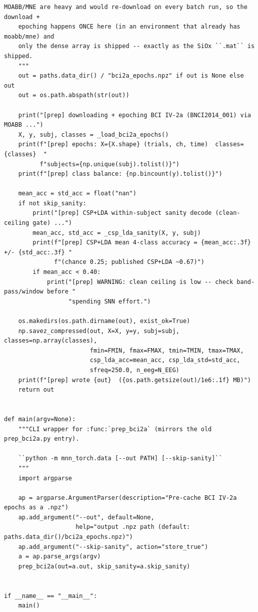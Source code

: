 \begin{lstlisting}[caption={mnn\_torch/data.py},label={lst:mnn-src-data}]
    MOABB/MNE are heavy and would re-download on every batch run, so the download +
    epoching happens ONCE here (in an environment that already has moabb/mne) and
    only the dense array is shipped -- exactly as the SiOx ``.mat`` is shipped.
    """
    out = paths.data_dir() / "bci2a_epochs.npz" if out is None else out
    out = os.path.abspath(str(out))

    print("[prep] downloading + epoching BCI IV-2a (BNCI2014_001) via MOABB ...")
    X, y, subj, classes = _load_bci2a_epochs()
    print(f"[prep] epochs: X={X.shape} (trials, ch, time)  classes={classes}  "
          f"subjects={np.unique(subj).tolist()}")
    print(f"[prep] class balance: {np.bincount(y).tolist()}")

    mean_acc = std_acc = float("nan")
    if not skip_sanity:
        print("[prep] CSP+LDA within-subject sanity decode (clean-ceiling gate) ...")
        mean_acc, std_acc = _csp_lda_sanity(X, y, subj)
        print(f"[prep] CSP+LDA mean 4-class accuracy = {mean_acc:.3f} +/- {std_acc:.3f} "
              f"(chance 0.25; published CSP+LDA ~0.67)")
        if mean_acc < 0.40:
            print("[prep] WARNING: clean ceiling is low -- check band-pass/window before "
                  "spending SNN effort.")

    os.makedirs(os.path.dirname(out), exist_ok=True)
    np.savez_compressed(out, X=X, y=y, subj=subj, classes=np.array(classes),
                        fmin=FMIN, fmax=FMAX, tmin=TMIN, tmax=TMAX,
                        csp_lda_acc=mean_acc, csp_lda_std=std_acc,
                        sfreq=250.0, n_eeg=N_EEG)
    print(f"[prep] wrote {out}  ({os.path.getsize(out)/1e6:.1f} MB)")
    return out


def main(argv=None):
    """CLI wrapper for :func:`prep_bci2a` (mirrors the old prep_bci2a.py entry).

    ``python -m mnn_torch.data [--out PATH] [--skip-sanity]``
    """
    import argparse

    ap = argparse.ArgumentParser(description="Pre-cache BCI IV-2a epochs as a .npz")
    ap.add_argument("--out", default=None,
                    help="output .npz path (default: paths.data_dir()/bci2a_epochs.npz)")
    ap.add_argument("--skip-sanity", action="store_true")
    a = ap.parse_args(argv)
    prep_bci2a(out=a.out, skip_sanity=a.skip_sanity)


if __name__ == "__main__":
    main()
\end{lstlisting}

